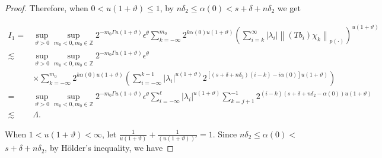 \documentclass[10pt,a4paper]{amsart}
\begin{document}
\begin{proof}
Therefore, when $0<u(1+\vartheta) \leq  1$, by $n \delta_{2} \leq  \alpha(0)<s+\delta+n \delta_{2}$ we get


\begin{align*}
 I_{1}= &  \sup_{\vartheta>0 }\sup _{m_0<0, m_0\in  \mathbb{Z}} 2^{-m_0\Gamma u(1+\vartheta)} \epsilon  ^\theta\sum_{k=-\infty}^{m_0} 2^{k \alpha(0) u(1+\vartheta)}\left(\sum_{i=k}^{\infty}\left|\lambda_{i}\right|\left\|\left(T b_{i}\right) \chi_{k}\right\|_{{p(\cdot)}}\right)^{u(1+\vartheta)}\\
\lesssim &  \sup_{\vartheta>0 }\sup _{m_0<0, m_0\in  \mathbb{Z}} 2^{-m_0\Gamma u(1+\vartheta)} \epsilon  ^\theta \\
& \times \sum_{k=-\infty}^{m_0} 2^{k \alpha(0) u(1+\vartheta)}\left(\sum_{i=-\infty}^{k-1}\left|\lambda_{i}\right|^{u(1+\vartheta)} 2^{\left[\left(s+\delta+n \delta_{2}\right)(i-k)-i \alpha(0)\right] u(1+\vartheta)}\right)\\
=& \sup_{\vartheta>0 }\sup _{m_0<0, m_0\in  \mathbb{Z}} 2^{-m_0\Gamma u(1+\vartheta)} \epsilon  ^\theta \sum_{i=-\infty}^{\ell }\left|\lambda_{i}\right|^{u(1+\vartheta)} \sum_{k=j+1}^{-1} 2^{(i-k)\left(s+\delta+n \delta_{2}-\alpha(0)\right) u(1+\vartheta)} \\
 \lesssim & \Lambda  .
\end{align*}




When $1<u(1+\vartheta)<\infty$, let $\frac{1}{u(1+\vartheta)}+ \frac{1}{(u(1+\vartheta))\prime}=1$. Since $n \delta_{2} \leq  \alpha(0)<$ $s+\delta+n \delta_{2}$, by H\"older's inequality, we have



\end{proof}
\end{document}

